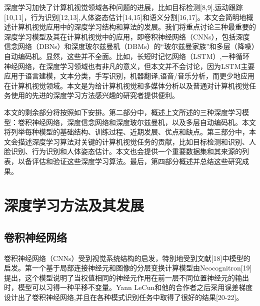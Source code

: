 \documentclass[a4paper]{article}
\begin{document}
深度学习加快了计算机视觉领域各种问题的进展，比如目标检测[8,9],运动跟踪[10,11]，行为识别[12,13],人体姿态估计[14,15]和语义分割[16,17]。本文会简明地概述计算机视觉应用中的深度学习结构和算法的发展。我们将重点讨论三种最重要的深度学习模型及其在计算机视觉中的应用，即卷积神经网络（CNNs），包括深度信念网络（DBNs）和深度玻尔兹曼机（DBMs）的“玻尔兹曼家族”和多层（降噪）自动编码机。显然，这些并不全面。比如，长短时记忆网络（LSTM）,一种循环神经网络，在深度学习领域也有非凡的意义，但本文并不会讨论，因为LSTM主要应用于语言建模，文本分类，手写识别，机器翻译,语音/音乐分析，而更少地应用在计算机视觉领域。本文是为给计算机视觉和多媒体分析以及普通对计算机视觉任务使用的先进的深度学习方法感兴趣的研究者提供便利。

本文的剩余部分将按照如下安排。第二部分中，概述上文所述的三种深度学习模型：卷积神经网络，深度信念网络和深度玻尔兹曼机，以及多层自动编码机。本文将列举每种模型的基础结构、训练过程、近期发展、优点和缺点。第三部分中，本文会描述深度学习算法对关键的计算机视觉任务的贡献，比如目标检测和识别、人脸识别、行为识别和人体姿态估计。本文也会提供一个重要数据集和其来源的列表，以备评估和验证这些深度学习算法。最后，第四部分概述并总结这些研究成果。
\section{深度学习方法及其发展}
\subsection{卷积神经网络} %
卷积神经网络（CNNs）受到视觉系统结构的启发，特别地受到文献[18]中模型的启发。第一个基于局部连接神经元和图像的分层变换计算模型由Neocognitron[19]提出，这个模型说明了当权值相同的神经元作用在前一层不同位置神经元的输出时，模型可以习得一种平移不变量。Yann LeCun和他的合作者之后采用误差梯度设计出了卷积神经网络,并且在各种模式识别任务中取得了很好的结果[20-22]。
\end{document}
